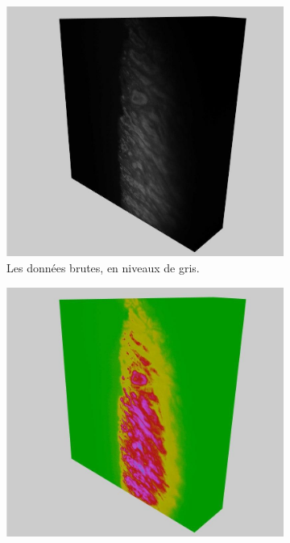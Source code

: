 {{{            \begin{figure}[h]
                \centering
                \begin{subfigure}{.45\linewidth}
                    \centering
                    \includegraphics[width=.9\linewidth]{img/visu_screens/black_white.jpg}
                    \captionsetup{width=.9\linewidth}
                    \caption{Les données brutes, en niveaux de gris.}
                    \label{img:visualisateur:color_scale_comparaison:black_white}
                \end{subfigure}
                \begin{subfigure}{.45\linewidth}
                    \centering
                    \includegraphics[width=.9\linewidth]{img/visu_screens/colored.jpg}

\end{subfigure}
\end{figure}}}}
